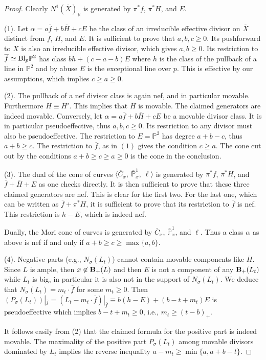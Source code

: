 \documentclass[12pt]{amsart}
\theoremstyle{definition}
\newcommand{\bb}{\ensuremath{\mathfrak{b}}}
\renewcommand{\geq}{\geqslant}
\newcommand{\?}{ \circled{{\large\bf ?}}}
\let\bb\mathbb
\begin{document}
\begin{proof} 
Clearly $N^1(\overline X)_{\bb R}$ is generated by $\pi^*f$, $\pi^*H$, and $E$.

(1). Let $\alpha=a\overline f+b\overline H+cE$ be the class of an irreducible effective divisor on $\overline X$ distinct from $\overline f$, $\overline H$, and $E$. It is sufficient to prove that $a,b,c\geq 0$. Its pushforward to $X$ is also an irreducible effective divisor, which gives $a,b\geq 0$.
Its restriction to $\overline f\simeq{\rm Bl}_p\bb P^2$ has class $bh+(c-a-b)E$ where $h$ is the class of the pullback of a line in $\bb P^2$ and by abuse $E$ is the exceptional line over $p$. This is effective by our assumptions, which implies $c\geq a\geq 0$.

(2). The pullback of a nef divisor class is again nef, and in particular movable. Furthermore $\overline H\equiv\overline H'$. This implies that $\overline H$ is movable. The claimed generators are indeed movable. Conversely, let $\alpha=a\overline f+b\overline H+cE$ be a movable divisor class. It is in particular pseudoeffective, thus $a,b,c\geq 0$. Its restriction to any divisor must also be pseudoeffective. 
The restriction to $E=\bb P^2$ has degree $a+b-c$, thus $a+b\geq c$.
The restriction to $\overline f$, as in $(1)$ gives the condition $c\geq a$.
The cone cut out by the conditions $a+b\geq c\geq a\geq 0$ is the cone in the conclusion. 

(3). The dual of the cone of curves $\langle\overline C_x,\ \overline{\bb P}^1_x,\ \ell\rangle$ is generated by  $\pi^*f$, $\pi^*H$, and $\overline f+\overline H+E$ as one checks directly. It is then sufficient to prove that these three claimed generators are nef. This is clear for the first two. For the last one, which can be written as $\overline f+\pi^*H$, it is sufficient to prove that its restriction to $\overline f$ is nef. This restriction is $h-E$, which is indeed nef. 

Dually, the Mori cone of curves is generated by $\overline C_x$, $\overline{\bb P}^1_x$, and $\ell$. Thus a class $\alpha$ as above is nef if and only if $a+b\geq c\geq\max\{a,b\}$.


(4). Negative parts (e.g., $N_{\sigma}(L_t)$) cannot contain movable components like $\overline H$. Since $L$ is ample, then $x\not\in{\bf B}_+(L)$ and then $E$ is not a component of any ${\bf B}_+(L_t)$ while $L_t$ is big, in particular it is also not in the support of $N_{\sigma}(L_t)$. We deduce that $N_{\sigma}(L_t)=m_t\cdot\overline f$ for some $m_t\geq 0$. 
Then $(P_{\sigma}(L_t))|_{\overline f}=(L_t-m_t\cdot\overline f)|_{\overline f}\equiv b(h-E)+(b-t+m_t)E$ is pseudoeffective which implies $b-t+m_t\geq 0$, i.e., $m_t\geq(t-b)_+$.

It follows easily from (2) that the claimed formula for the positive part is indeed movable. The maximality of the positive part $P_{\sigma}(L_t)$ among movable divisors dominated by $L_t$ implies the reverse inequality $a-m_t\geq\min\{a,a+b-t\}$.  
\end{proof} 
\end{document}
